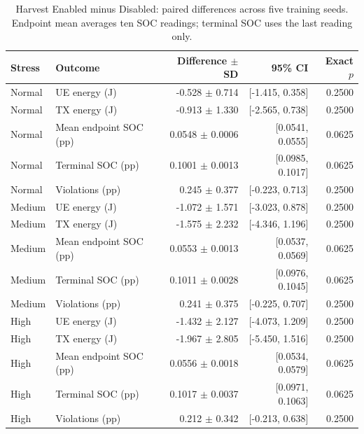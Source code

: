 \begin{table}[t]
\centering\footnotesize
\caption{Harvest Enabled minus Disabled: paired differences across five training seeds. Endpoint mean averages ten SOC readings; terminal SOC uses the last reading only.}
\label{tab:ehdiff}
\begin{tabular}{@{}llrrr@{}}\toprule
Stress & Outcome & Difference $\pm$ SD & 95\% CI & Exact $p$\\\midrule
Normal & UE energy (J) & -0.528 $\pm$ 0.714 & [-1.415, 0.358] & 0.2500 \\
Normal & TX energy (J) & -0.913 $\pm$ 1.330 & [-2.565, 0.738] & 0.2500 \\
Normal & Mean endpoint SOC (pp) & 0.0548 $\pm$ 0.0006 & [0.0541, 0.0555] & 0.0625 \\
Normal & Terminal SOC (pp) & 0.1001 $\pm$ 0.0013 & [0.0985, 0.1017] & 0.0625 \\
Normal & Violations (pp) & 0.245 $\pm$ 0.377 & [-0.223, 0.713] & 0.2500 \\
Medium & UE energy (J) & -1.072 $\pm$ 1.571 & [-3.023, 0.878] & 0.2500 \\
Medium & TX energy (J) & -1.575 $\pm$ 2.232 & [-4.346, 1.196] & 0.2500 \\
Medium & Mean endpoint SOC (pp) & 0.0553 $\pm$ 0.0013 & [0.0537, 0.0569] & 0.0625 \\
Medium & Terminal SOC (pp) & 0.1011 $\pm$ 0.0028 & [0.0976, 0.1045] & 0.0625 \\
Medium & Violations (pp) & 0.241 $\pm$ 0.375 & [-0.225, 0.707] & 0.2500 \\
High & UE energy (J) & -1.432 $\pm$ 2.127 & [-4.073, 1.209] & 0.2500 \\
High & TX energy (J) & -1.967 $\pm$ 2.805 & [-5.450, 1.516] & 0.2500 \\
High & Mean endpoint SOC (pp) & 0.0556 $\pm$ 0.0018 & [0.0534, 0.0579] & 0.0625 \\
High & Terminal SOC (pp) & 0.1017 $\pm$ 0.0037 & [0.0971, 0.1063] & 0.0625 \\
High & Violations (pp) & 0.212 $\pm$ 0.342 & [-0.213, 0.638] & 0.2500 \\
\bottomrule\end{tabular}
\end{table}
